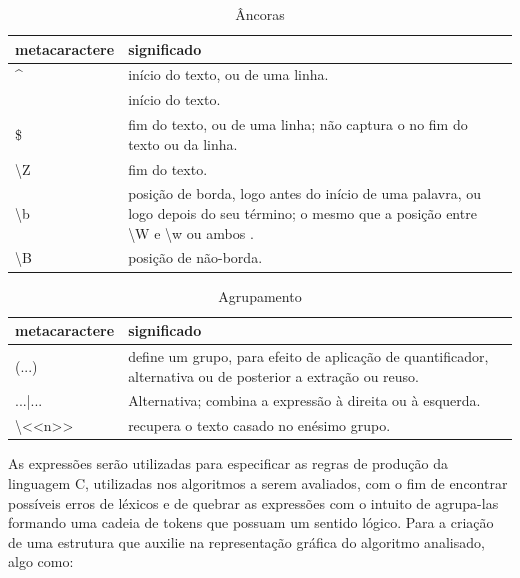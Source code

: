 \begin{table}[htbp!]
  \centering
    \caption{Âncoras}
      \begin{tabularx}{\textwidth}{|X|X|X|}
      \hline
      \textbf{metacaractere} &  \textbf{significado} \\
      \hline
      \textasciicircum{} & início do texto, ou de uma linha. \\
      \hline
      \A & início do texto.\\
      \hline
      \$ & fim do texto, ou de uma linha; não captura o \n no fim do texto ou da linha.\\
      \hline
      \textbackslash{}Z & fim do texto. \\
      \hline
      \textbackslash{}b & posição de borda, logo antes do início de uma palavra, ou logo depois do seu término; o mesmo que a posição entre \textbackslash{}W e \textbackslash{}w ou ambos . \\
      \hline
      \textbackslash{}B & posição de não-borda. \\
      \hline
      \end{tabularx}
  \label{Tabela2}
\end{table}

\begin{table}[htbp!]
  \centering
    \caption{Agrupamento}
      \begin{tabularx}{\textwidth}{|X|X|X|}
      \hline
      \textbf{metacaractere} &  \textbf{significado} \\
      \hline
      (...) & define um grupo, para efeito de aplicação de quantificador, alternativa ou de posterior a extração ou reuso. \\
      \hline
      ...|... & Alternativa; combina a expressão à direita ou à esquerda. \\
      \hline
      \textbackslash{}<<n>> & recupera o texto casado no enésimo grupo.\\
      \hline
      \end{tabularx}
  \label{Tabela3}
\end{table}

\pagebreak




\par As expressões serão utilizadas para especificar as regras de produção da linguagem C, utilizadas nos algoritmos a serem avaliados, com o fim de encontrar possíveis erros de léxicos e de quebrar as expressões com o intuito de agrupa-las formando uma cadeia de tokens que possuam um sentido lógico. Para a criação de uma estrutura que auxilie na representação gráfica do algoritmo analisado, algo como:

